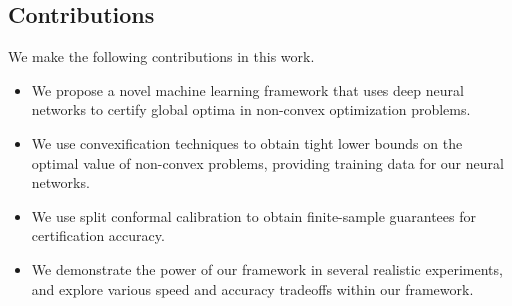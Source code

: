 \documentclass[10pt]{article} %
\theoremstyle{plain}
\theoremstyle{definition}
\theoremstyle{remark}
\begin{document}



\subsection{Contributions}

We make the following contributions in this work.
\begin{itemize}[itemsep=2pt, parsep=1pt]
    \item We propose a novel machine learning framework that uses deep neural networks to certify global optima in non-convex optimization problems.
    \item We use convexification techniques to obtain tight lower bounds on the optimal value of non-convex problems, providing training data for our neural networks.
    \item We use split conformal calibration to obtain finite-sample guarantees for certification accuracy.
    \item We demonstrate the power of our framework in several realistic experiments, and explore various speed and accuracy tradeoffs within our framework.
\end{itemize}
\end{document}
